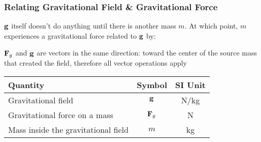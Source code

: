 \documentclass[12pt,compress,aspectratio=169]{beamer}
\newcommand{\mb}[1]{\ensuremath\mathbf{#1}}
\newcommand{\eq}[2]{\vspace{#1}{\Large\begin{displaymath}#2\end{displaymath}}}
\begin{document}
\begin{frame}
  \frametitle{Relating Gravitational Field \& Gravitational Force}

  $\mb{g}$ itself doesn't do anything until there is another mass $m$. At which
  point, $m$ experiences a gravitational force related to $\mb{g}$ by:

  \eq{-.2in}{
    \boxed{\mb{F}=m\mb{g}}
  }
  
  $\mb{F}_g$ and  $\mb{g}$ are vectors in the same direction: toward the
  center of the source mass that created the field, therefore all vector
  operations apply

  \begin{center}
    \begin{tabular}{l|c|c}
      \rowcolor{pink}
      \textbf{Quantity} & \textbf{Symbol} & \textbf{SI Unit} \\ \hline
      Gravitational field & $\mb{g}$   & \si{N/kg}\\
      Gravitational force on a mass & $\mb{F}_g$ & \si{N} \\
      Mass inside the gravitational field & $m$ & \si{kg} \\
    \end{tabular}
  \end{center}
\end{frame}
\end{document}
